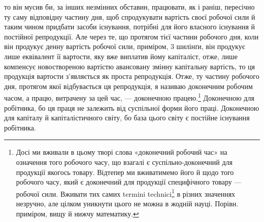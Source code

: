 \parcont{}  %
то він мусив би, за інших незмінних обставин, працювати, як і раніш, пересічно ту саму відповідну
частину дня, щоб спродукувати вартість своєї робочої сили й таким чином придбати засоби існування,
потрібні для його власного існування й постійної репродукції. Але через те, що протягом тієї частини
робочого дня,
коли він продукує денну вартість робочої сили, приміром, 3 шилінґи, він продукує лише еквівалент її
вартости, яку вже виплатив йому капіталіст, отже, лише компенсує новоствореною вартістю
авансовану змінну капітальну вартість, то ця продукція вартости з’являється як проста репродукція.
Отже, ту частину
робочого дня, протягом якої відбувається ця репродукція, я називаю доконечним робочим часом, а
працю, витрачену
за цей час, — доконечною працею.\footnote{
Досі ми вживали в цьому творі слова «доконечний робочий час» на означення того робочого часу, що
взагалі є суспільно-доконечний для продукції якогось товару. Відтепер ми вживатимемо його й щодо
того
робочого часу, який є доконечний для продукції специфічного товару — робочої сили. Вживати тих самих
termini technici\footnote*{
— технічних термінів. Ред.
} в різних значеннях незручно, але цілком уникнути цього не можна в жодній науці.
Порівн. приміром, вищу й нижчу математику.
} Доконечною для робітника, бо ця праця не залежить від суспільної
форми його праці.
Доконечною для капіталу й капіталістичного світу, бо база цього
світу є постійне існування робітника.

